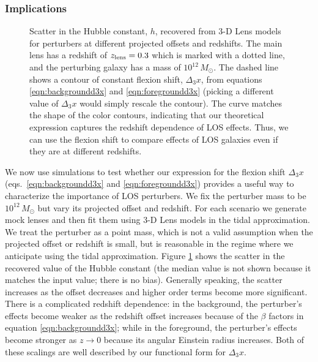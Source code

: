 \documentclass{emulateapj}
\begin{document}
\subsubsection{Implications}

\begin{figure}[t]
\begin{center}
\caption{\label{toyhd3x} Scatter in the Hubble constant, $h$, recovered from 3-D Lens models for perturbers at different projected offsets and redshifts.  The main lens has a redshift of $z_{\rm{lens}} = 0.3$ which is marked with a dotted line, and the perturbing galaxy has a mass of $10^{12}\,M_\odot$.  The dashed line shows a contour of constant flexion shift, $\Delta_3 x$, from equations \ref{eqn:backgroundd3x} and \ref{eqn:foregroundd3x} (picking a different value of $\Delta_3 x$ would simply rescale the contour).  The curve matches the shape of the color contours, indicating that our theoretical expression captures the redshift dependence of LOS effects.  Thus, we can use the flexion shift to compare effects of LOS galaxies even if they are at different redshifts.
}
\end{center}
\end{figure}

We now use simulations to test whether our expression for the flexion shift $\Delta_3 x$ (eqs.\ \ref{eqn:backgroundd3x} and \ref{eqn:foregroundd3x}) provides a useful way to characterize the importance of LOS perturbers.  We fix the perturber mass to be $10^{12}\,M_\odot$ but vary its projected offset and redshift.  For each scenario we generate mock lenses and then fit them using 3-D Lens models in the tidal approximation.  We treat the perturber as a point mass, which is not a valid assumption when the projected offset or redshift is small, but is reasonable in the regime where we anticipate using the tidal approximation.  Figure \ref{toyhd3x} shows the scatter in the recovered value of the Hubble constant (the median value is not shown because it matches the input value; there is no bias).  Generally speaking, the scatter increases as the offset decreases and higher order terms become more significant.  There is a complicated redshift dependence: in the background, the perturber's effects become weaker as the redshift offset increases because of the $\beta$ factors in equation \ref{eqn:backgroundd3x}; while in the foreground, the perturber's effects become stronger as $z \to 0$ because its angular Einstein radius increases.  Both of these scalings are well described by our functional form for $\Delta_3 x$.
\end{document}
